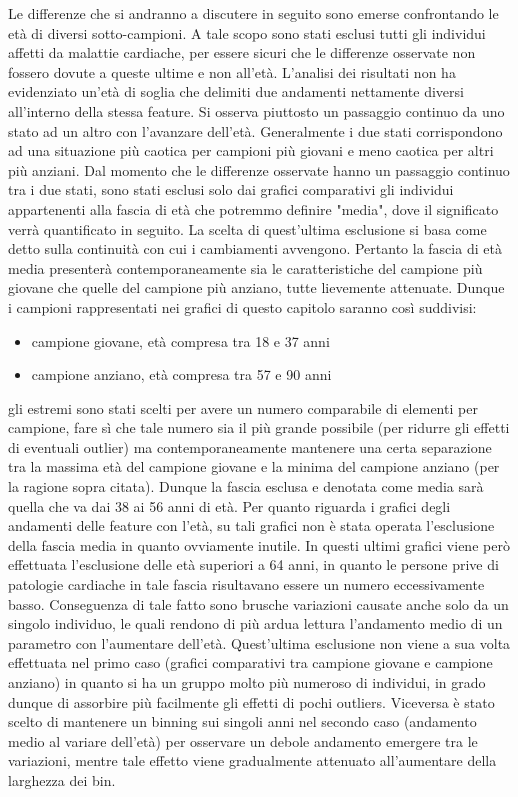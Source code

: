 \documentclass[a4paper, 12pt]{book}
\begin{document}
Le differenze che si andranno a discutere in seguito sono emerse confrontando le età di diversi sotto-campioni.
A tale scopo sono stati esclusi tutti gli individui affetti da malattie cardiache, per essere sicuri che le differenze osservate non fossero dovute a queste ultime e non all'età.
L'analisi dei risultati non ha evidenziato un'età di soglia che delimiti due andamenti nettamente diversi all'interno della stessa feature.
Si osserva piuttosto un passaggio continuo da uno stato ad un altro con l'avanzare dell'età.
Generalmente i due stati corrispondono ad una situazione più caotica per campioni più giovani e meno caotica per altri più anziani.
Dal momento che le differenze osservate hanno un passaggio continuo tra i due stati, sono stati esclusi solo dai grafici comparativi gli individui appartenenti alla fascia di età che potremmo definire "media", dove il significato verrà quantificato in seguito.
La scelta di quest'ultima esclusione si basa come detto sulla continuità con cui i cambiamenti avvengono. 
Pertanto la fascia di età media presenterà contemporaneamente sia le caratteristiche del campione più giovane che quelle del campione più anziano, tutte lievemente attenuate.
Dunque i campioni rappresentati nei grafici di questo capitolo saranno così suddivisi:\begin{itemize}
	\item campione giovane, età compresa tra 18 e 37 anni
	\item campione anziano, età compresa tra 57 e 90 anni
\end{itemize}
gli estremi sono stati scelti per avere un numero comparabile di elementi per campione, fare sì che tale numero sia il più grande possibile (per ridurre gli effetti di eventuali outlier) ma contemporaneamente mantenere una certa separazione tra la massima età del campione giovane e la minima del campione anziano (per la ragione sopra citata).
Dunque la fascia esclusa e denotata come media sarà quella che va dai 38 ai 56 anni di età.
Per quanto riguarda i grafici degli andamenti delle feature con l'età, su tali grafici non è stata operata l'esclusione della fascia media in quanto ovviamente inutile.
In questi ultimi grafici viene però effettuata l'esclusione delle età superiori a 64 anni, in quanto le persone prive di patologie cardiache in tale fascia risultavano essere un numero eccessivamente basso. 
Conseguenza di tale fatto sono brusche variazioni causate anche solo da un singolo individuo, le quali rendono di più ardua lettura l'andamento medio di un parametro con l'aumentare dell'età.
Quest'ultima esclusione non viene a sua volta effettuata nel primo caso (grafici comparativi tra campione giovane e campione anziano) in quanto si ha un gruppo molto più numeroso di individui, in grado dunque di assorbire più facilmente gli effetti di pochi outliers. 
Viceversa è stato scelto di mantenere un binning sui singoli anni nel secondo caso (andamento medio al variare dell'età) per osservare un debole andamento emergere tra le variazioni, mentre tale effetto viene gradualmente attenuato all'aumentare della larghezza dei bin.
\end{document}
